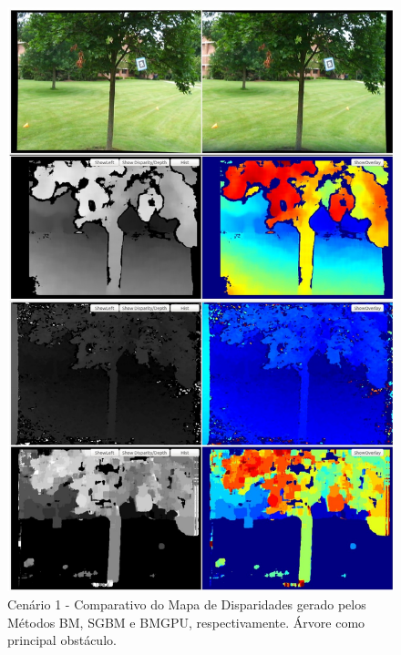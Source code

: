 \begin{figure}[H]
 	\centering
 	\includegraphics[scale=0.35]{./Resources/results/scene1_montage.jpg}
 	\caption{Cenário 1 - Comparativo do Mapa de Disparidades gerado pelos Métodos BM, SGBM e BMGPU, respectivamente. Árvore como principal obstáculo.}
 	\label{scene1_montage}
\end{figure}

